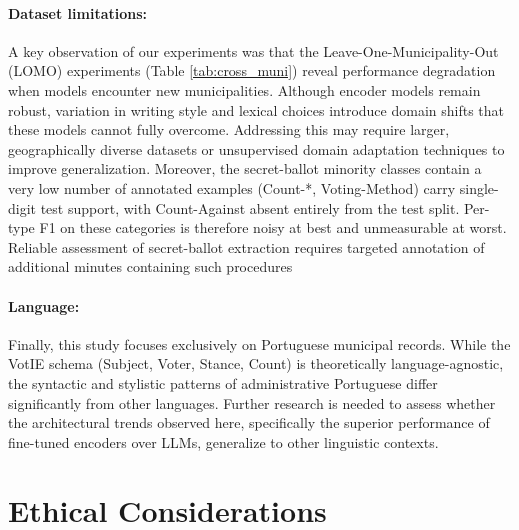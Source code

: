 \documentclass[11pt]{article}
\begin{document}
\paragraph{Dataset limitations:}A key observation of our experiments was that the Leave-One-Municipality-Out (LOMO) experiments (Table \ref{tab:cross_muni}) reveal performance degradation when models encounter new municipalities. Although encoder models remain robust, variation in writing style and lexical choices introduce domain shifts that these models cannot fully overcome. Addressing this may require larger, geographically diverse datasets or unsupervised domain adaptation techniques to improve generalization. Moreover, the secret-ballot minority classes contain a very low number of annotated examples (Count-*, Voting-Method) carry single-digit test support, with Count-Against absent entirely from the test split. Per-type F1 on these categories is therefore noisy at best and unmeasurable at worst. Reliable assessment of secret-ballot extraction requires targeted annotation of additional minutes containing such procedures

\paragraph{Language:} Finally, this study focuses exclusively on Portuguese municipal records. While the VotIE schema (Subject, Voter, Stance, Count) is theoretically language-agnostic, the syntactic and stylistic patterns of administrative Portuguese differ significantly from other languages. Further research is needed to assess whether the architectural trends observed here, specifically the superior performance of fine-tuned encoders over LLMs, generalize to other linguistic contexts.


\section{Ethical Considerations}
\label{sec:ethical}
\end{document}
